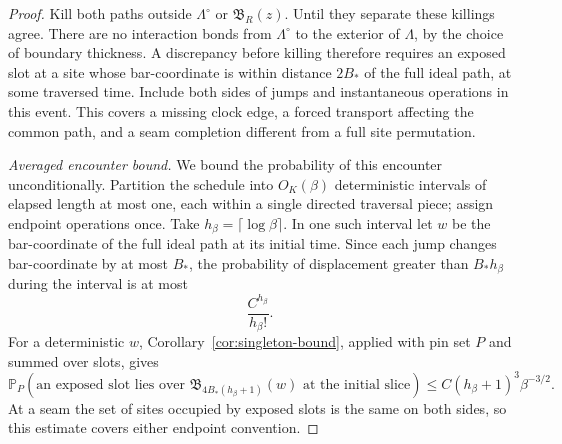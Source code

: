 \begin{proof}
Kill both paths outside \(\Lambda^\circ\) or
\(\mathfrak B_R(z)\). Until they separate these killings agree.
There are no interaction bonds from \(\Lambda^\circ\) to the
exterior of \(\Lambda\), by the choice of boundary thickness.
A discrepancy before killing therefore requires an exposed slot at a
site whose bar-coordinate is within distance \(2B_*\) of the full
ideal path, at some traversed time. Include both sides of jumps and
instantaneous operations in this event. This covers a missing clock
edge, a forced transport affecting the common path, and a seam
completion different from a full site permutation.

\medskip\noindent
\emph{Averaged encounter bound.}
We bound the probability of this encounter unconditionally. Partition
the schedule into \(O_K(\beta)\) deterministic intervals of elapsed
length at most one, each within a single directed traversal piece;
assign endpoint operations once. Take
\(h_\beta=\lceil\log\beta\rceil\). In one such interval let
\(w\) be the bar-coordinate of the full ideal path at its initial
time. Since each jump changes bar-coordinate by at most \(B_*\),
the probability of displacement greater than \(B_*h_\beta\) during
the interval is at most
\begin{equation}\label{eq:ideal-short-tail}
 \frac{C^{h_\beta}}{h_\beta!}.
\end{equation}
For a deterministic \(w\), Corollary~\ref{cor:singleton-bound},
applied with pin set \(P\) and summed over slots, gives
\begin{equation}\label{eq:encounter-initial}
 \mathbb P_P\!\left(
  \text{an exposed slot lies over }
  \mathfrak B_{4B_*(h_\beta+1)}(w)
  \text{ at the initial slice}\right)
 \le C(h_\beta+1)^3\beta^{-3/2}.
\end{equation}
At a seam the set of sites occupied by exposed slots is the same on
both sides, so this estimate covers either endpoint convention.


\end{proof}
